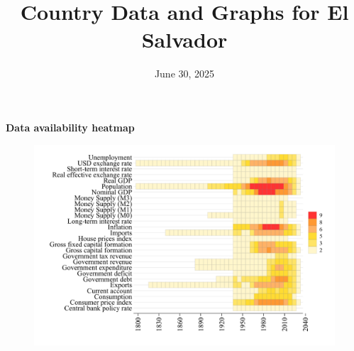 \documentclass[12pt,a4paper,landscape]{article}
\begin{document}
\title{\Large Country Data and Graphs for El Salvador}
\date{June 30, 2025}
\maketitle
\thispagestyle{empty}

\clearpage
\setcounter{page}{1}
\hypersetup{colorlinks=true,linkcolor=blue,linktoc=all}
\label{toc}
\tableofcontents
\thispagestyle{empty}
\clearpage
{}
{}
\begin{center}
{\Large\bfseries Data availability heatmap}
\end{center}
\vspace{1cm}
\begin{figure}[H]
\centering
\includegraphics[width=\textwidth,height=0.8\textheight,keepaspectratio]{graphs/SLV_heatmap.pdf}
\end{figure}
\setcounter{page}{3}
\end{document}

